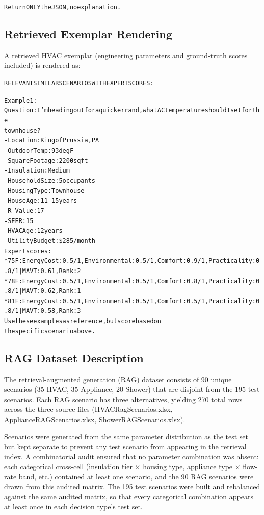 \documentclass[11pt]{article}
\begin{document}
\begin{minipage}{\columnwidth}
\begin{alltt}
\footnotesize
Return ONLY the JSON, no explanation.
\end{alltt}
\end{minipage}

\subsection{Retrieved Exemplar Rendering}
\noindent A retrieved HVAC exemplar (engineering parameters and ground-truth scores included) is rendered as:

\begin{alltt}
\footnotesize
RELEVANT SIMILAR SCENARIOS WITH EXPERT SCORES:

Example 1:
  Question: I'm heading out for a quick errand, what AC temperature should I set for the
    townhouse?
  - Location: King of Prussia, PA
  - Outdoor Temp: 93 deg F
  - Square Footage: 2200 sqft
  - Insulation: Medium
  - Household Size: 5 occupants
  - Housing Type: Townhouse
  - House Age: 11-15 years
  - R-Value: 17
  - SEER: 15
  - HVAC Age: 12 years
  - Utility Budget: \$285/month
  Expert scores:
  * 75 F: Energy Cost: 0.5/1, Environmental: 0.5/1, Comfort: 0.9/1, Practicality: 0.8/1 | MAVT: 0.61, Rank: 2
  * 78 F: Energy Cost: 0.5/1, Environmental: 0.5/1, Comfort: 0.8/1, Practicality: 0.8/1 | MAVT: 0.62, Rank: 1
  * 81 F: Energy Cost: 0.5/1, Environmental: 0.5/1, Comfort: 0.5/1, Practicality: 0.8/1 | MAVT: 0.58, Rank: 3
Use these examples as reference, but score based on
the specific scenario above.
\end{alltt}

\subsection{RAG Dataset Description}
\label{app:rag_corpus}

The retrieval-augmented generation (RAG) dataset consists of 90 unique
scenarios (35 HVAC, 35 Appliance, 20 Shower) that are disjoint
from the 195 test scenarios. Each RAG scenario has three alternatives,
yielding 270 total rows across the three source files
(HVACRagScenarios.xlsx, ApplianceRAGScenarios.xlsx,
ShowerRAGScenarios.xlsx).

Scenarios were generated from the same parameter distribution as the test
set but kept separate to prevent any test scenario from appearing in the
retrieval index. A combinatorial audit ensured that no parameter
combination was absent: each categorical cross-cell (insulation
tier $\times$ housing type, appliance type $\times$ flow-rate band, etc.)
contained at least one scenario, and the 90 RAG scenarios were drawn from
this audited matrix. The 195 test scenarios were built and rebalanced
against the same audited matrix, so that every categorical combination
appears at least once in each decision type's test set.
\end{document}
